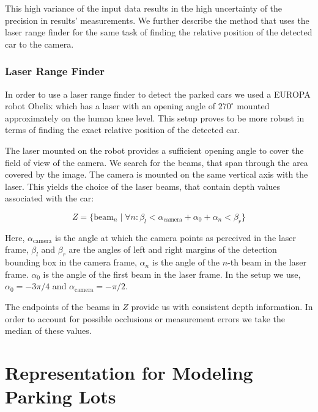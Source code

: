 This high variance of the input data results in the high uncertainty of the
precision in results' measurements. We further describe the method that uses
the laser range finder for the same task of finding the relative position of
the detected car to the camera.

\subsubsection{Laser Range Finder}\label{ssub:laser_range_finder}

In order to use a laser range finder to detect the parked cars we used a
EUROPA robot Obelix which has a laser with an opening angle of $270^\circ$
mounted approximately on the human knee level. This setup proves to be more
robust in terms of finding the exact relative position of the detected car.

The laser mounted on the robot provides a sufficient opening angle to cover
the field of view of the camera. We search for the beams, that span through
the area covered by the image. The camera is mounted on the same vertical axis
with the laser. This yields the choice of the laser beams, that contain depth
values associated with the car:

\begin{equation}
Z = \{ \mathrm{beam}_n \mid \forall n : \beta_{l} < \alpha_{\mathrm{camera}} + \alpha_{0} + \alpha_{n} < \beta_{r} \}
\end{equation}

Here, $\alpha_\mathrm{camera}$ is the angle at which the camera points as perceived
in the laser frame, $\beta_{l}$ and $\beta_{r}$ are the angles of left and
right margins of the detection bounding box in the camera frame, $\alpha_{n}$
is the angle of the $n$-th beam in the laser frame. $\alpha_{0}$ is the angle
of the first beam in the laser frame. In the setup we use, $\alpha_{0} =
-3\pi/4$ and $\alpha_\mathrm{camera} = -\pi/2$.

The endpoints of the beams in $Z$ provide us with consistent depth
information. In order to account for possible occlusions or measurement errors
we take the median of these values.


\section{Representation for Modeling Parking Lots} %
\label{sec:model}

